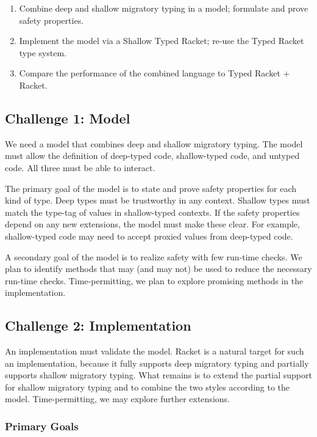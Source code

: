 \begin{enumerate}
\item Combine deep and shallow migratory typing in a model; formulate and prove safety properties.
\item Implement the model via a Shallow Typed Racket; re-use the Typed Racket type system.
\item Compare the performance of the combined language to Typed Racket + Racket.
\end{enumerate}

\subsection{Challenge 1: Model}

We need a model that combines deep and shallow migratory typing.
The model must allow the definition of deep-typed code, shallow-typed code, and untyped code.
All three must be able to interact.

The primary goal of the model is to state and prove safety properties for each kind of type.
Deep types must be trustworthy in any context.
Shallow types must match the type-tag of values in shallow-typed contexts.
If the safety properties depend on any new extensions, the model must make these clear.
For example, shallow-typed code may need to accept proxied values from deep-typed code.


A secondary goal of the model is to realize safety with few run-time checks.
We plan to identify methods that may (and may not) be used to reduce the necessary run-time checks.
Time-permitting, we plan to explore promising methods in the implementation.


\subsection{Challenge 2: Implementation}

An implementation must validate the model.
Racket is a natural target for such an implementation, because it fully supports deep migratory typing and partially supports shallow migratory typing.
What remains is to extend the partial support for shallow migratory typing and to combine the two styles according to the model.
Time-permitting, we may explore further extensions.


\subsubsection{Primary Goals}

